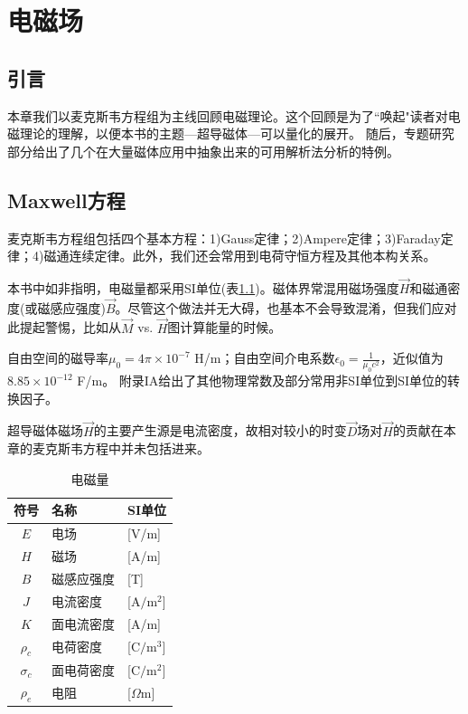 \chapter{电磁场}
\section{引言}
本章我们以麦克斯韦方程组为主线回顾电磁理论。这个回顾是为了``唤起"读者对电磁理论的理解，以便本书的主题---超导磁体---可以量化的展开。
随后，专题研究部分给出了几个在大量磁体应用中抽象出来的可用解析法分析的特例。
\section{Maxwell方程}
麦克斯韦方程组包括四个基本方程：1)Gauss定律；2)Ampere定律；3)Faraday定律；4)磁通连续定律。此外，我们还会常用到电荷守恒方程及其他本构关系。

本书中如非指明，电磁量都采用SI单位(表\ref{emquantity})。磁体界常混用磁场强度$\vec{H}$和磁通密度(或磁感应强度)$\vec{B}$。尽管这个做法并无大碍，也基本不会导致混淆，但我们应对此提起警惕，比如从$\vec{M}$ vs. $\vec{H}$图计算能量的时候。

自由空间的磁导率$\mu_0=4\pi \times 10^{-7}$ H/m；自由空间介电系数$\epsilon_0=\frac{1}{\mu_0c^2}$，近似值为$8.85\times 10^{-12}$ F/m。
附录IA给出了其他物理常数及部分常用非SI单位到SI单位的转换因子。

超导磁体磁场$\vec{H}$的主要产生源是电流密度，故相对较小的时变$\vec{D}$场对$\vec{H}$的贡献在本章的麦克斯韦方程中并未包括进来。

\begin{table}[htbp]\small
  \centering
  \caption{电磁量} \label{emquantity}
\begin{tabular}{|c|l|l|}
  \hline
  符号 & 名称 & SI单位 \\ \hline
  $E$&电场&[V/m] \\ \hline
  $H$&磁场&[A/m] \\ \hline
  $B$&磁感应强度&[T]\\ \hline
  $J$&电流密度&[$\mathrm{A/m^2}$] \\ \hline
  $K$&面电流密度&[A/m]\\ \hline
  $\rho_c$&电荷密度&[$\mathrm{C/m^3}$]\\ \hline
  $\sigma_c$&面电荷密度&[$\mathrm{C/m^2}]$\\ \hline
  $\rho_e$&电阻&[$\Omega$m]\\
  \hline
\end{tabular}
\end{table}

